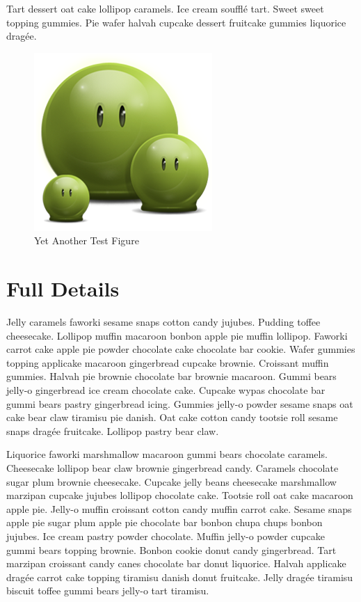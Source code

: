 \documentclass{uumthesis}
\begin{document}
Tart dessert oat cake lollipop caramels. Ice cream soufflé tart. Sweet sweet topping gummies. Pie wafer halvah cupcake dessert fruitcake gummies liquorice dragée.

\begin{figure}[hbt!]\centering
   \includegraphics[width=.3\textwidth]{green} 
   \caption{Yet Another Test Figure}
   \label{fig:dummy:3}
\end{figure}





\appendix
\chapter{Full Details}
Jelly caramels faworki sesame snaps cotton candy jujubes. Pudding toffee cheesecake. Lollipop muffin macaroon bonbon apple pie muffin lollipop. Faworki carrot cake apple pie powder chocolate cake chocolate bar cookie. Wafer gummies topping applicake macaroon gingerbread cupcake brownie. Croissant muffin gummies. Halvah pie brownie chocolate bar brownie macaroon. Gummi bears jelly-o gingerbread ice cream chocolate cake. Cupcake wypas chocolate bar gummi bears pastry gingerbread icing. Gummies jelly-o powder sesame snaps oat cake bear claw tiramisu pie danish. Oat cake cotton candy tootsie roll sesame snaps dragée fruitcake. Lollipop pastry bear claw.

Liquorice faworki marshmallow macaroon gummi bears chocolate caramels. Cheesecake lollipop bear claw brownie gingerbread candy. Caramels chocolate sugar plum brownie cheesecake. Cupcake jelly beans cheesecake marshmallow marzipan cupcake jujubes lollipop chocolate cake. Tootsie roll oat cake macaroon apple pie. Jelly-o muffin croissant cotton candy muffin carrot cake. Sesame snaps apple pie sugar plum apple pie chocolate bar bonbon chupa chups bonbon jujubes. Ice cream pastry powder chocolate. Muffin jelly-o powder cupcake gummi bears topping brownie. Bonbon cookie donut candy gingerbread. Tart marzipan croissant candy canes chocolate bar donut liquorice. Halvah applicake dragée carrot cake topping tiramisu danish donut fruitcake. Jelly dragée tiramisu biscuit toffee gummi bears jelly-o tart tiramisu.
\end{document}
